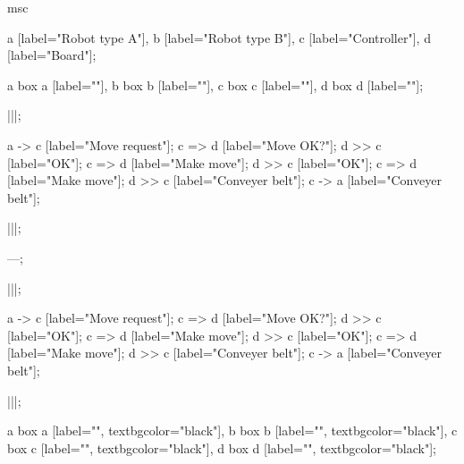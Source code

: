 \begin{msc}
msc
{

a [label="Robot type A"],
b [label="Robot type B"],
c [label="Controller"],
d [label="Board"];

a box a [label=""],
b box b [label=""],
c box c [label=""],
d box d [label=""];

|||;

a -> c [label="Move request"];
c => d [label="Move OK?"];
d >> c [label="OK"];
c => d [label="Make move"];
d >> c [label="OK"];
c => d [label="Make move"];
d >> c [label="Conveyer belt"];
c -> a [label="Conveyer belt"];

|||;

---;

|||;

a -> c [label="Move request"];
c => d [label="Move OK?"];
d >> c [label="OK"];
c => d [label="Make move"];
d >> c [label="OK"];
c => d [label="Make move"];
d >> c [label="Conveyer belt"];
c -> a [label="Conveyer belt"];

|||;

a box a [label="", textbgcolor="black"],
b box b [label="", textbgcolor="black"],
c box c [label="", textbgcolor="black"],
d box d [label="", textbgcolor="black"];

}
\end{msc}
